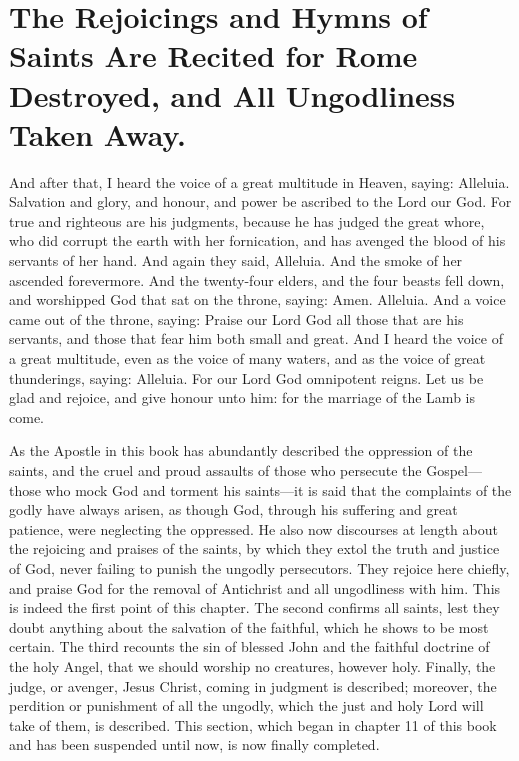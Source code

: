 \chapter[Sermon 81. The Rejoicings and Hymns of Saints Are Recited for Rome Destroyed, and All Ungodliness Taken Away.]{The Rejoicings and Hymns of Saints Are Recited for Rome Destroyed, and All Ungodliness Taken Away.}
\label{sermon:081}

And after that, I heard the voice of a great multitude in Heaven, saying: Alleluia. Salvation and glory, and honour, and power be ascribed to the Lord our God. For true and righteous are his judgments, because he has judged the great whore, who did corrupt the earth with her fornication, and has avenged the blood of his servants of her hand. And again they said, Alleluia. And the smoke of her ascended forevermore. And the twenty-four elders, and the four beasts fell down, and worshipped God that sat on the throne, saying: Amen. Alleluia. And a voice came out of the throne, saying: Praise our Lord God all those that are his servants, and those that fear him both small and great. And I heard the voice of a great multitude, even as the voice of many waters, and as the voice of great thunderings, saying: Alleluia. For our Lord God omnipotent reigns. Let us be glad and rejoice, and give honour unto him: for the marriage of the Lamb is come.

As the Apostle in this book has abundantly described the oppression of the saints, and the cruel and proud assaults of those who persecute the Gospel—those who mock God and torment his saints—it is said that the complaints of the godly have always arisen, as though God, through his suffering and great patience, were neglecting the oppressed. He also now discourses at length about the rejoicing and praises of the saints, by which they extol the truth and justice of God, never failing to punish the ungodly persecutors. They rejoice here chiefly, and praise God for the removal of Antichrist and all ungodliness with him. This is indeed the first point of this chapter. The second confirms all saints, lest they doubt anything about the salvation of the faithful, which he shows to be most certain. The third recounts the sin of blessed John and the faithful doctrine of the holy Angel, that we should worship no creatures, however holy. Finally, the judge, or avenger, Jesus Christ, coming in judgment is described; moreover, the perdition or punishment of all the ungodly, which the just and holy Lord will take of them, is described. This section, which began in chapter 11 of this book and has been suspended until now, is now finally completed.

